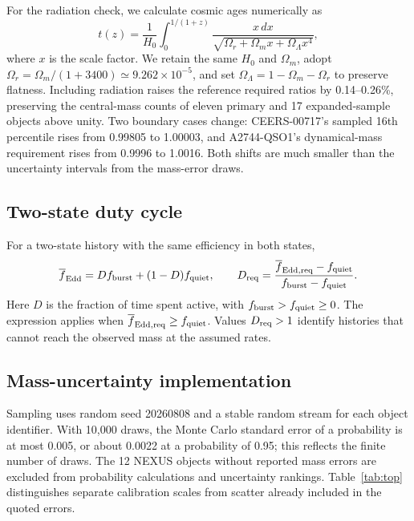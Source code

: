 \documentclass[pdflatex,sn-basic]{sn-jnl}
\begin{document}
For the radiation check, we calculate cosmic ages numerically as
\begin{equation}
t(z)=\frac{1}{H_0}\int_0^{1/(1+z)}
\frac{x\,dx}{\sqrt{\Omega_r+\Omega_m x+\Omega_\Lambda x^4}},
\label{eq:cosmictime-radiation}
\end{equation}
where $x$ is the scale factor. We retain the same $H_0$ and $\Omega_m$,
adopt $\Omega_r=\Omega_m/(1+3400)\simeq9.262\times10^{-5}$, and set
$\Omega_\Lambda=1-\Omega_m-\Omega_r$ to preserve flatness.
Including radiation raises the reference required ratios by 0.14--0.26\%, preserving the central-mass counts of eleven
primary and 17 expanded-sample objects above unity. Two boundary cases
change: CEERS-00717's sampled 16th percentile rises from 0.99805 to 1.00003,
and A2744-QSO1's dynamical-mass requirement rises from 0.9996 to 1.0016.
Both shifts are much smaller than the uncertainty intervals from the
mass-error draws.

\subsection{Two-state duty cycle}

For a two-state history with the same efficiency in both states,
\begin{equation}
\overline{f}_{\mathrm{Edd}}=D f_{\rm burst}+(1-D)f_{\rm quiet},\qquad
D_{\rm req}=\frac{\overline{f}_{\mathrm{Edd,req}}-f_{\rm quiet}}
{f_{\rm burst}-f_{\rm quiet}}.
\label{eq:dutycycle}
\end{equation}
Here $D$ is the fraction of time spent active, with
$f_{\rm burst}>f_{\rm quiet}\geq0$. The expression applies when
$\overline{f}_{\mathrm{Edd,req}}\geq f_{\rm quiet}$. Values $D_{\rm req}>1$
identify histories that cannot reach the observed mass at the assumed rates.

\subsection{Mass-uncertainty implementation}
\label{app:implementation}

Sampling uses random seed 20260808 and a stable random stream for each object
identifier. With 10,000 draws, the Monte Carlo standard error of a probability
is at most 0.005, or about 0.0022 at a probability of 0.95; this reflects the
finite number of draws. The 12 NEXUS objects without reported mass errors
are excluded from probability calculations and uncertainty rankings. Table~\ref{tab:top} distinguishes separate
calibration scales from scatter already included in the quoted errors.
\end{document}

